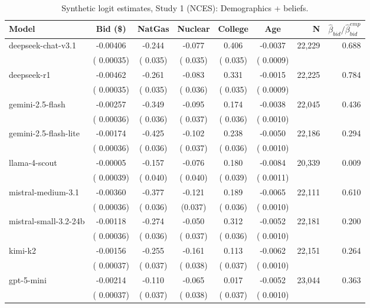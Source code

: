 \begin{table}[H]
\centering
\caption{Synthetic logit estimates, Study 1 (NCES): Demographics + beliefs.}
\label{tab:syn-logit-withBeliefs}
\begin{threeparttable}
\footnotesize
\begin{tabular}{lcccccrr}
\toprule
Model & Bid (\$) & NatGas & Nuclear & College & Age & N & $\hat\beta_{bid}/\hat\beta_{bid}^{emp}$ \\
\midrule
deepseek-chat-v3.1 &  -0.00406 &  -0.244 &  -0.077 &   0.406 & -0.0037 &    22,229 &  0.688 \\
 & (  0.00035) & (  0.035) & (  0.035) & (  0.035) & ( 0.0009) & & \\
deepseek-r1 &  -0.00462 &  -0.261 &  -0.083 &   0.331 & -0.0015 &    22,225 &  0.784 \\
 & (  0.00035) & (  0.035) & (  0.036) & (  0.035) & ( 0.0009) & & \\
gemini-2.5-flash &  -0.00257 &  -0.349 &  -0.095 &   0.174 & -0.0038 &    22,045 &  0.436 \\
 & (  0.00036) & (  0.036) & (  0.037) & (  0.036) & ( 0.0010) & & \\
gemini-2.5-flash-lite &  -0.00174 &  -0.425 &  -0.102 &   0.238 & -0.0050 &    22,186 &  0.294 \\
 & (  0.00036) & (  0.036) & (  0.037) & (  0.036) & ( 0.0010) & & \\
llama-4-scout &  -0.00005 &  -0.157 &  -0.076 &   0.180 & -0.0084 &    20,339 &  0.009 \\
 & (  0.00039) & (  0.040) & (  0.040) & (  0.039) & ( 0.0011) & & \\
mistral-medium-3.1 &  -0.00360 &  -0.377 &  -0.121 &   0.189 & -0.0065 &    22,111 &  0.610 \\
 & (  0.00036) & (  0.036) & (0.037) & (  0.036) & ( 0.0010) & & \\
mistral-small-3.2-24b &  -0.00118 &  -0.274 &  -0.050 &   0.312 & -0.0052 &    22,181 &  0.200 \\
 & (  0.00036) & (  0.036) & (  0.037) & (  0.036) & ( 0.0010) & & \\
kimi-k2 &  -0.00156 &  -0.255 &  -0.161 &   0.113 & -0.0062 &    22,151 &  0.264 \\
 & (  0.00037) & (  0.037) & (  0.038) & (  0.037) & ( 0.0010) & & \\
gpt-5-mini &  -0.00214 &  -0.110 &  -0.065 &   0.017 & -0.0052 &    23,044 &  0.363 \\
 & (  0.00037) & (  0.037) & (  0.038) & (  0.037) & ( 0.0010) & & \\

\end{tabular}
\end{threeparttable}
\end{table}
